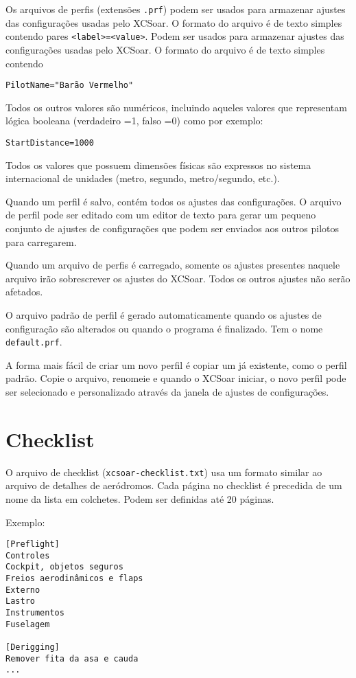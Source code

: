 Os arquivos de perfis (extensões \verb|.prf|) podem ser usados para armazenar ajustes das configurações usadas pelo XCSoar.  O formato do arquivo é de texto simples contendo pares \verb|<label>=<value>|.  Podem ser usados para armazenar ajustes das configurações usadas pelo XCSoar.  O formato do arquivo é de texto simples contendo
\begin{verbatim}
PilotName="Barão Vermelho"
\end{verbatim}
Todos os outros valores são numéricos, incluindo aqueles valores que representam lógica booleana (verdadeiro =1, falso =0) como por exemplo:
\begin{verbatim}
StartDistance=1000
\end{verbatim}

Todos os valores que possuem dimensões físicas são expressos no sistema internacional de unidades (metro, segundo, metro/segundo, etc.).

Quando um perfil é salvo, contém todos os ajustes das configurações.  O arquivo de perfil pode ser editado com um editor de texto para gerar um pequeno conjunto de ajustes de configurações que podem ser enviados aos outros pilotos para carregarem.

Quando um arquivo de perfis é carregado, somente os ajustes presentes naquele arquivo irão sobrescrever os ajustes do XCSoar.  Todos os outros ajustes não serão afetados.

O arquivo padrão de perfil é gerado automaticamente quando os ajustes de configuração são alterados ou quando o programa é finalizado.  Tem o nome \verb|default.prf|.

A forma mais fácil de criar um novo perfil é copiar um já existente, como o perfil padrão.  Copie o arquivo, renomeie e quando o XCSoar iniciar, o novo perfil pode ser selecionado e personalizado através da janela de ajustes de configurações. 


\section{Checklist}\label{sec:checklist-file}

O arquivo de checklist (\verb|xcsoar-checklist.txt|) usa um formato similar ao arquivo de detalhes de aeródromos.  Cada página no checklist é precedida de um nome da lista em colchetes.  Podem ser definidas até 20 páginas.

Exemplo:

\begin{verbatim}
[Preflight]
Controles
Cockpit, objetos seguros
Freios aerodinâmicos e flaps
Externo
Lastro
Instrumentos
Fuselagem

[Derigging]
Remover fita da asa e cauda
...
\end{verbatim}

